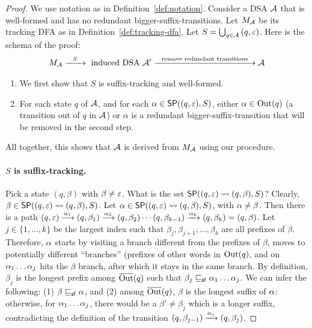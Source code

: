 \begin{proof}
  We use notation as in Definition~\ref{def:notation}.
  Consider a DSA $\mathcal{A}$ that is well-formed and has no redundant
  bigger-suffix-transitions. Let $M_{\mathcal{A}}$ be its tracking DFA as in
  Definition~\ref{def:tracking-dfa}. Let $S = \bigcup_{q\in\mathcal{A}}
  {(q,\varepsilon)}$. Here is the schema of the proof:
  \begin{align*}
  M_{\mathcal{A}} \xrightarrow{~~S~~} \text{ induced DSA } \mathcal{A}' \xrightarrow{~~\text{remove redundant transitions~~}} \mathcal{A}
  \end{align*}
  \begin{enumerate}
  \item We first show that $S$ is suffix-tracking and well-formed.
  \item For each state $q$ of $\mathcal{A}$, and for each $\alpha \in \mathsf{SP}((q,\varepsilon), S)$, either $\alpha \in \operatorname{Out}(q)$ (a transition out of $q$ in $\mathcal{A}$) or $\alpha$ is a redundant bigger-suffix-transition that will be removed in the second step. 
  \end{enumerate}
  All together, this shows that $\mathcal{A}$ is derived from $M_{\mathcal{A}}$ using our procedure.

  
  \paragraph*{$S$ is suffix-tracking.} 
  Pick a state $(q, \beta)$ with $\beta \neq \varepsilon$. What is the set
  $\mathsf{SP}((q, \varepsilon) \rightsquigarrow (q, \beta), S)$? Clearly, $\beta \in \mathsf{SP}((q,
    \varepsilon) \rightsquigarrow (q, \beta), S)$. Let $\alpha \in \mathsf{SP}((q,
    \varepsilon) \rightsquigarrow (q, \beta), S)$, with $\alpha \neq \beta$. Then there is a path
  $(q, \varepsilon) \xrightarrow{\alpha_1} (q, \beta_1) \xrightarrow{\alpha_2} (q, \beta_2) \cdots (q, \beta_{k-1})
  \xrightarrow{\alpha_k} (q, \beta_k) = (q, \beta)$. Let $j \in \{1, \dots, k\}$
  be the largest index such that $\beta_j, \beta_{j+1}, \dots,
  \beta_k$ are all prefixes of $\beta$. Therefore, $\alpha$ starts by visiting a
  branch different from the prefixes of $\beta$, moves to potentially
  different ``branches'' (prefixes of other words in $\operatorname{Out}(q)$, and on
  $\alpha_1 \dots 
  \alpha_j$ hits the $\beta$ branch, after which it stays in the same
  branch. By definition, $\beta_j$ is the longest prefix among
  $\overline{\operatorname{Out}}(q)$ such that $\beta_j \sqsubseteq_{\mathsf {sf}} \alpha_1 \dots \alpha_j$. We can infer
  the following: (1) $\beta \sqsubseteq_{\mathsf {sf}} \alpha$, and (2) among $\overline{\operatorname{Out}}(q)$,
  $\beta$ is the longest suffix of $\alpha$: otherwise, for $\alpha_1 \dots
  \alpha_j$, there would be a $\beta' \neq \beta_j$ which is a longer
  suffix, contradicting the definition of the transition $(q,
  \beta_{j-1}) \xrightarrow{\alpha_j} (q, \beta_j)$. 


\end{proof}
